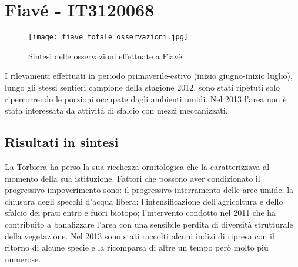 \documentclass[11pt,a4paper,twoside]{memoir}
\begin{document}
\newpage
\section{Fiavé - IT3120068}
\vspace*{\fill}
\begin{figure}[H]

  \centering
  \texttt{[image: fiave\_totale\_osservazioni.jpg]}
  \caption{Sintesi delle osservazioni effettuate a Fiavè}
\end{figure}\vspace*{\fill}

I rilevamenti effettuati in periodo primaverile-estivo (inizio giugno-inizio luglio), lungo gli stessi sentieri campione della stagione 2012, sono stati ripetuti solo ripercorrendo le porzioni occupate dagli ambienti umidi. Nel 2013 l’area non è stata interessata da attività di sfalcio con mezzi meccanizzati. 

\subsection{Risultati in sintesi}
La Torbiera ha perso la sua ricchezza ornitologica che la caratterizzava al momento della sua istituzione. Fattori che possono aver condizionato il progressivo impoverimento sono: il progressivo interramento delle aree umide; la chiusura degli specchi d’acqua libera; l’intensificazione dell’agricoltura e dello sfalcio dei prati entro e fuori biotopo; l’intervento condotto nel 2011 che ha contribuito a banalizzare l’area con una sensibile perdita di diversità strutturale della vegetazione. Nel 2013 sono stati raccolti alcuni indizi di ripresa con il ritorno di alcune specie e la ricomparsa di altre un tempo però molto più numerose. 
\end{document}
